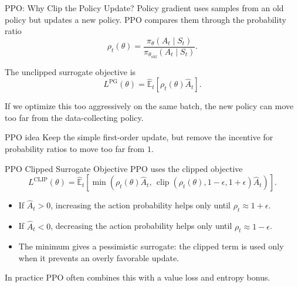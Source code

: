 \documentclass[aspectratio=169]{beamer}
\newcommand{\EE}{\mathbb{E}}
\begin{document}
\begin{frame}{PPO: Why Clip the Policy Update?}
\small
Policy gradient uses samples from an old policy but updates a new policy.  PPO compares them through the probability ratio
\[
\rho_t(\theta)
=
\frac{\pi_\theta(A_t\mid S_t)}
{\pi_{\theta_{\mathrm{old}}}(A_t\mid S_t)}.
\]

\vspace{0.4em}
The unclipped surrogate objective is
\[
L^{\mathrm{PG}}(\theta)
=
\widehat{\EE}_t\!\left[\rho_t(\theta)\widehat A_t\right].
\]

\vspace{0.4em}
If we optimize this too aggressively on the same batch, the new policy can move too far from the data-collecting policy.

\begin{block}{PPO idea}
Keep the simple first-order update, but remove the incentive for probability ratios to move too far from $1$.
\end{block}
\end{frame}

\begin{frame}{PPO Clipped Surrogate Objective}
\small
PPO uses the clipped objective
\[
L^{\mathrm{CLIP}}(\theta)
=
\widehat{\EE}_t
\left[
\min\left(
\rho_t(\theta)\widehat A_t,\,
\operatorname{clip}(\rho_t(\theta),1-\epsilon,1+\epsilon)\widehat A_t
\right)
\right].
\]

\vspace{0.5em}
\begin{itemize}
    \item If $\widehat A_t>0$, increasing the action probability helps only until $\rho_t\approx 1+\epsilon$.
    \item If $\widehat A_t<0$, decreasing the action probability helps only until $\rho_t\approx 1-\epsilon$.
    \item The minimum gives a pessimistic surrogate: the clipped term is used only when it prevents an overly favorable update.
\end{itemize}

\vspace{0.4em}
In practice PPO often combines this with a value loss and entropy bonus.
\end{frame}
\end{document}
